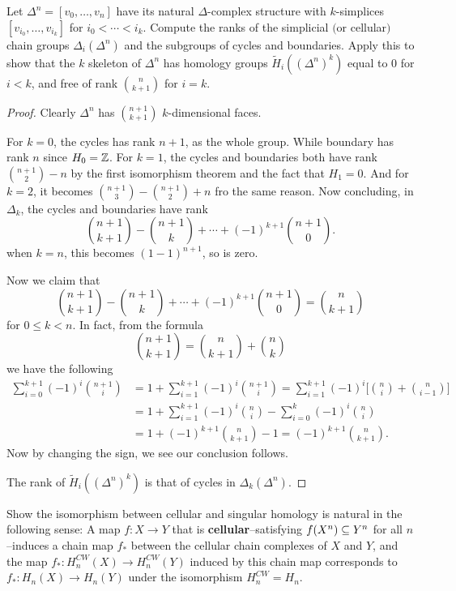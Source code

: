 \begin{exercise}
Let $\Delta^n=[v_0,\dots,v_n]$ have its natural $\Delta$-complex structure with $k$-simplices $[v_{i_0},\dots,v_{i_k}]$ for $i_0<\cdots<i_k$. Compute the ranks of the simplicial $($or cellular$)$ chain groups $\Delta_i(\Delta^n)$ and the subgroups of cycles and boundaries. Apply this to show that the $k$ skeleton of $\Delta^n$ has homology groups $\widetilde{H}_i((\Delta^n)^k)$ equal
to $0$ for $i<k$, and free of rank $\binom{n}{k+1}$ for $i=k$.
\end{exercise}
\begin{proof}
Clearly $\Delta^n$ has $\binom{n+1}{k+1}$ $k$-dimensional faces.\par
For $k=0$, the cycles has rank $n+1$, as the whole group. While boundary has rank $n$ since $H_0=\mathbb{Z}$. For $k=1$, the cycles and boundaries both have rank $\binom{n+1}{2}-n$ by the first isomorphism theorem and the fact that $H_1=0$. And for $k=2$, it becomes $\binom{n+1}{3}-\binom{n+1}{2}+n$ fro the same reason. Now concluding, in $\Delta_k$, the cycles and boundaries have rank
\[\binom{n+1}{k+1}-\binom{n+1}{k}+\cdots+(-1)^{k+1}\binom{n+1}{0}.\]
when $k=n$, this becomes $(1-1)^{n+1}$, so is zero.\par
Now we claim that 
\[\binom{n+1}{k+1}-\binom{n+1}{k}+\cdots+(-1)^{k+1}\binom{n+1}{0}=\binom{n}{k+1}\]
for $0\leq k<n$. In fact, from the formula 
\[\binom{n+1}{k+1}=\binom{n}{k+1}+\binom{n}{k}\]
we have the following
\begin{align*}
\sum_{i=0}^{k+1}(-1)^i\binom{n+1}{i}&=1+\sum_{i=1}^{k+1}(-1)^i\binom{n+1}{i}=\sum_{i=1}^{k+1}(-1)^i\Big[\binom{n}{i}+\binom{n}{i-1}\Big]\\
&=1+\sum_{i=1}^{k+1}(-1)^i\binom{n}{i}-\sum_{i=0}^{k}(-1)^i\binom{n}{i}\\
&=1+(-1)^{k+1}\binom{n}{k+1}-1=(-1)^{k+1}\binom{n}{k+1}.
\end{align*}
Now by changing the sign, we see our conclusion follows.\par
The rank of $\widetilde{H}_i((\Delta^n)^k)$ is that of cycles in $\Delta_k(\Delta^n)$.
\end{proof}
\begin{exercise}
Show the isomorphism between cellular and singular homology is natural in the following sense: A map $f:X\to Y$ that is \textbf{cellular}--satisfying $f(X^n)\subseteq Y^n$ for all $n$--induces a chain map $f_*$ between the cellular chain complexes of $X$ and $Y$, and the map $f_*:H^{CW}_n(X)\to H^{CW}_n(Y)$ induced by this chain map corresponds to $f_*:H_n(X)\to H_n(Y)$ under the isomorphism $H_n^{CW}=H_n$.
\end{exercise}
